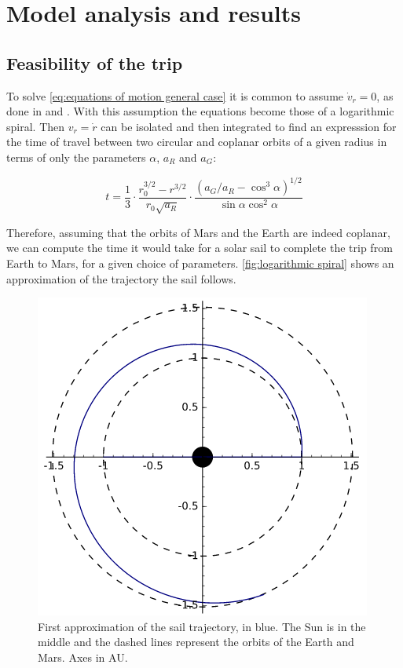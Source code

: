 \documentclass[twocolumn,12pt,a4paper]{article}
\numberwithin{equation}{section}
\begin{document}
\section{Model analysis and results}
\subsection{Feasibility of the trip} \label{sec:Feasibility of the trip}
To solve \autoref{eq:equations of motion general case} it is common to assume \( \dot{v}_r = 0\), as done in \cite{tsu} and \cite{mcinnes}. With this assumption the equations become those of a logarithmic spiral. Then \( v_r = \dot{r} \) can be isolated and then integrated to find an expresssion for the time of travel between two circular and coplanar orbits of a given radius in terms of only the parameters \( \alpha \), \( a_R \) and \( a_G \):

\begin{equation} \label{eq:time of flight between orbits}
	t=\frac{1}{3}\cdot\frac{r_0^{3/2}-r^{3/2}}{r_0\sqrt{a_R}}\cdot\frac{(a_G/a_R-\cos^3\alpha)^{1/2}}{\sin\alpha\cos^2\alpha}
\end{equation}

Therefore, assuming that the orbits of Mars and the Earth are indeed coplanar, we can compute the time it would take for a solar sail to complete the trip from Earth to Mars, for a given choice of parameters. \autoref{fig:logarithmic spiral} shows an approximation of the trajectory the sail follows.

\begin{figure}
	\centering
	\includegraphics[scale=0.5]{espiral.png}
	\caption{First approximation of the sail trajectory, in blue. The Sun is in the middle and the dashed lines represent the orbits of the Earth and Mars. Axes in AU.}
	\label{fig:logarithmic spiral}
\end{figure}
\end{document}
